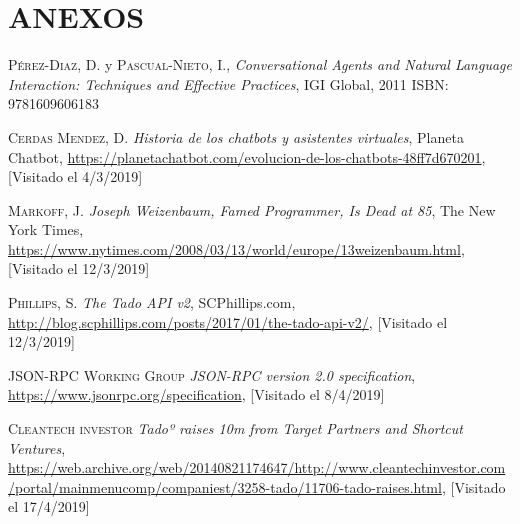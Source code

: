 \documentclass[spanish,12pt, a4paper, twoside]{paper}
\let\oldsection\section
\def\section{\cleardoublepage\oldsection}
\begin{document}
\section*{ANEXOS}


\newpage

\begin{thebibliography}{00}
 \textsc{Pérez-Diaz, D.} y \textsc{Pascual-Nieto, I.},
	\textit{Conversational Agents and Natural Language Interaction: Techniques and Effective Practices}, IGI Global, 2011 ISBN: 9781609606183
	
 \textsc{Cerdas Mendez, D.}
	\textit{Historia de los chatbots y asistentes virtuales}, Planeta Chatbot, \url{https://planetachatbot.com/evolucion-de-los-chatbots-48ff7d670201}, [Visitado el 4/3/2019]
	
 \textsc{Markoff, J.}
	\textit{Joseph Weizenbaum, Famed Programmer, Is Dead at 85}, The New York Times, \url{https://www.nytimes.com/2008/03/13/world/europe/13weizenbaum.html}, [Visitado el 12/3/2019]
	
 \textsc{Phillips, S.}
	\textit{The Tado API v2}, SCPhillips.com, \url{http://blog.scphillips.com/posts/2017/01/the-tado-api-v2/}, [Visitado el 12/3/2019]
	
 \textsc{JSON-RPC Working Group} \textit{JSON-RPC version 2.0 specification}, \url{https://www.jsonrpc.org/specification}, [Visitado el 8/4/2019]

 \textsc{Cleantech investor} \textit{Tadoº raises \texteuro10m from Target Partners and Shortcut Ventures}, \url{https://web.archive.org/web/20140821174647/http://www.cleantechinvestor.com/portal/mainmenucomp/companiest/3258-tado/11706-tado-raises.html}, [Visitado el 17/4/2019]
\end{thebibliography}
\end{document}

